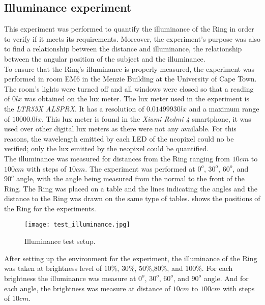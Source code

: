 \subsection{Illuminance experiment}
This experiment was performed to quantify the illuminance of the Ring in order to verify if it meets its requirements. Moreover, the experiment's purpose was also to find a relationship between the distance and illuminance, the relationship between the angular position of the subject and the illuminance.\\
To ensure that the Ring's illuminance is properly measured, the experiment was performed in room EM6 in the Menzie Building at the University of Cape Town. The room's lights were turned off and all windows were closed so that a reading of $0 lx$ was obtained on the lux meter. The lux meter used in the experiment is the \textit{LTR55X ALSPRX}. It has a resolution of $0.01499930 lx$ and a maximum range of $10000.0 lx$. This lux meter is found in the \textit{Xiami Redmi 4} smartphone, it was used over other digital lux meters as there were not any available. For this reasons, the wavelength emitted by each LED of the neopixel could no be verified; only the lux emitted by the neopixel could be quantified.\\
The illuminance was measured for distances from the Ring ranging from $10cm$ to $100cm$ with steps of $10cm$. The experiment was performed at $0^o$, $30^o$, $60^o$, and $90^o$ angle, with the angle being measured from the normal to the front of the Ring. The Ring was placed on a table and the lines indicating the angles and the distance to the Ring was drawn on the same type of tables.  shows the positions of the Ring for the experiments. 
\begin{figure}[h!]
	\centering
	\texttt{[image: test\_illuminance.jpg]}
	\caption{Illuminance test setup.}
	\label{fig:test_illuminance}
\end{figure}
After setting up the environment for the experiment, the illuminance of the Ring was taken at brightness level of $10\%$, $30\%$, $50\%$,$80\%$, and $100\%$. For each brightness the illuminance was measure at $0^o$, $30^o$, $60^o$, and $90^o$ angle. And for each angle, the brightness was measure at distance of $10cm$ to $100cm$ with steps of $10cm$.
